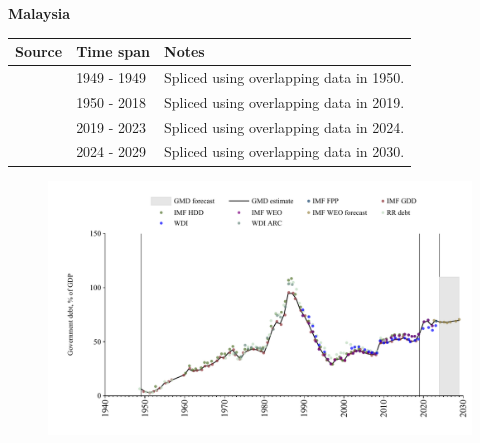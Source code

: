 \documentclass[12pt,a4paper,landscape]{article}
\begin{document}
\begin{adjustbox}{max totalsize={\paperwidth}{\paperheight},center}
\begin{minipage}[t][\textheight][t]{\textwidth}
\vspace*{0.5cm}
{}
\begin{center}
{\Large\bfseries Malaysia}
\end{center}
\vspace{0.5cm}
\begin{table}[H]
\centering
\small
\begin{tabular}{|l|l|l|}
\hline
\textbf{Source} & \textbf{Time span} & \textbf{Notes} \\
\hline
\rowcolor{white}\cite{RR_debt}& 1949 - 1949 &Spliced using overlapping data in 1950.\\
\rowcolor{lightgray}\cite{IMF_GDD}& 1950 - 2018 &Spliced using overlapping data in 2019.\\
\rowcolor{white}\cite{IMF_FPP}& 2019 - 2023 &Spliced using overlapping data in 2024.\\
\rowcolor{lightgray}\cite{IMF_WEO_forecast}& 2024 - 2029 &Spliced using overlapping data in 2030.\\
\hline
\end{tabular}
\end{table}
\begin{figure}[H]
\centering
\includegraphics[width=\textwidth,height=0.6\textheight,keepaspectratio]{graphs/MYS_govdebt_GDP.pdf}
\end{figure}
\end{minipage}
\end{adjustbox}
\end{document}
